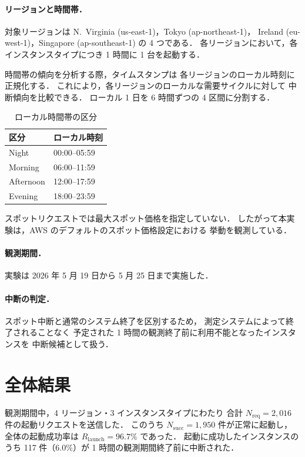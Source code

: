 \documentclass[11pt,a4paper]{ltjsreport}
\newcommand{\Rlaunch}{R_{\mathrm{launch}}}
\newcommand{\Nreq}{N_{\mathrm{req}}}
\newcommand{\Nsucc}{N_{\mathrm{succ}}}
\begin{document}
\paragraph{リージョンと時間帯．}
対象リージョンは N.~Virginia (us-east-1)，Tokyo (ap-northeast-1)，
Ireland (eu-west-1)，Singapore (ap-southeast-1) の 4 つである．
各リージョンにおいて，各インスタンスタイプにつき 1 時間に 1 台を起動する．

時間帯の傾向を分析する際，タイムスタンプは
各リージョンのローカル時刻に正規化する．
これにより，各リージョンのローカルな需要サイクルに対して
中断傾向を比較できる．
ローカル 1 日を 6 時間ずつの 4 区間に分割する．

\begin{table}[htbp]
\centering
\caption{ローカル時間帯の区分}
\label{tab:periods}
\small
\begin{tabular}{@{}ll@{}}
\toprule
区分 & ローカル時刻 \\
\midrule
Night     & 00:00--05:59 \\
Morning   & 06:00--11:59 \\
Afternoon & 12:00--17:59 \\
Evening   & 18:00--23:59 \\
\bottomrule
\end{tabular}
\end{table}

スポットリクエストでは最大スポット価格を指定していない．
したがって本実験は，AWS のデフォルトのスポット価格設定における
挙動を観測している．

\paragraph{観測期間．}
実験は 2026 年 5 月 19 日から 5 月 25 日まで実施した．

\paragraph{中断の判定．}
スポット中断と通常のシステム終了を区別するため，
測定システムによって終了されることなく
予定された 1 時間の観測終了前に利用不能となったインスタンスを
中断候補として扱う．

\section{全体結果}

観測期間中，4 リージョン・3 インスタンスタイプにわたり
合計 $\Nreq = 2{,}016$ 件の起動リクエストを送信した．
このうち $\Nsucc = 1{,}950$ 件が正常に起動し，
全体の起動成功率は $\Rlaunch = 96.7\%$ であった．
起動に成功したインスタンスのうち 117 件（$6.0\%$）が
1 時間の観測期間終了前に中断された．
\end{document}
